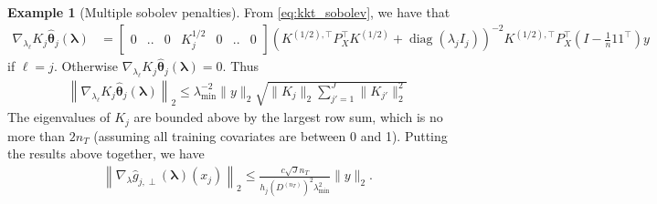 \documentclass[12pt]{article} %
\theoremstyle{definition}
\newtheorem{example}{Example}
\DeclareMathOperator{\diag}{diag}
\begin{document}
\begin{example}[Multiple sobolev penalties]
	From \eqref{eq:kkt_sobolev}, we have that
	\begin{align}
	\nabla_{\lambda_\ell} K_j \hat{\boldsymbol{\theta}}_j(\boldsymbol{\lambda})
	& = 
	\left[
	\begin{matrix}
	0 & .. & 0 & K_j^{1/2} & 0 & .. & 0
	\end{matrix}
	\right]
	\left(
	K^{(1/2), \top} P_X^\top K^{(1/2)} + \diag(\lambda_j I_j)
	\right)^{-2}
	K^{(1/2), \top}
	P_X^\top (I - \frac{1}{n} 1 1^\top) y
	\end{align}
	if $\ell = j$.
	Otherwise $\nabla_{\lambda_\ell} K_j \hat{\boldsymbol{\theta}}_j(\boldsymbol{\lambda}) = 0$.
	Thus
	\begin{align}
	\left\|
	\nabla_{\lambda_\ell} K_j \hat{\boldsymbol{\theta}}_j(\boldsymbol{\lambda})
	\right \|_2
	\le
	\lambda_{\min}^{-2} \|y\|_2 \sqrt{\|K_j\|_2 \sum_{{j'}=1}^J \|K_{j'}\|_2^2}
	\end{align}
	The eigenvalues of $K_j$ are bounded above by the largest row sum, which is no more than $2 n_T$ (assuming all training covariates are between 0 and 1).
	Putting the results above together, we have
	\begin{align}
	\left \|
	\nabla_{\lambda} \hat{g}_{j, \perp}(\boldsymbol{\lambda})(x_j)
	\right \|_2
	\le
	\frac{c \sqrt{J} n_T}{h_j(D^{(n_T)})^2 \lambda_{\min}^2}
	\|y\|_2.
	\end{align}
	

\end{example}
\end{document}

